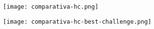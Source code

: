\documentclass[../informe2.tex]{subfiles}
\begin{document}
\begin{figure}[ht]
	\centering
	\texttt{[image: comparativa-hc.png]}
	\caption{\small}
	\label{fig:comparativa-hc}
\end{figure}

\begin{figure}[ht]
	\centering
	\texttt{[image: comparativa-hc-best-challenge.png]}
	\caption{\small}
	\label{fig:comparativa-hc-best-challenge}
\end{figure}
\end{document}
